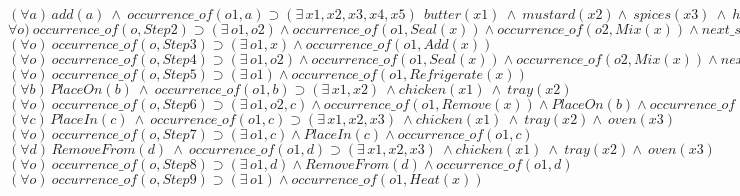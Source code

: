 \documentclass[10pt,a4paper]{article}
\begin{document}
	$(\forall a)\,add(a) \  \wedge \  occurrence\_of(o1,a) \supset (\exists\,x1,x2,x3,x4,x5)\  \ butter(x1) \ \wedge \  mustard(x2) \wedge \ spices(x3) \   \wedge \ hotsauce(x4)  \  \wedge \  thyme(x5)$\\
	
	$\forall o) \ occurrence\_of(o,Step2) \supset (\exists\, o1,o2) \wedge occurrence\_of(o1, Seal(x)) \wedge occurrence\_of(o2, Mix(x)) \wedge  next\_subacc(o1,o2)$\\
	
	$(\forall o) \ occurrence\_of(o,Step3) \supset (\exists\, o1,x) \wedge occurrence\_of(o1, Add(x))$\\
	
	$(\forall o) \ occurrence\_of(o,Step4) \supset (\exists\, o1,o2) \wedge occurrence\_of(o1, Seal(x)) \wedge occurrence\_of(o2, Mix(x)) \wedge  next\_subacc(o1,o2)$\\
	
	$(\forall o) \ occurrence\_of(o,Step5) \supset (\exists\, o1) \wedge occurrence\_of(o1, Refrigerate(x))$\\
	
	$(\forall b)\,PlaceOn(b) \  \wedge \  occurrence\_of(o1,b) \supset (\exists\,x1,x2)\  \wedge chicken(x1) \ \wedge \  tray(x2)$\\
	
	$(\forall o) \ occurrence\_of(o,Step6) \supset (\exists\, o1,o2,c) \wedge occurrence\_of(o1, Remove(x)) \wedge PlaceOn(b) \wedge occurrence\_of(o2, b) \wedge  next\_subacc(o1,o2)$\\
	
$	(\forall c)\,PlaceIn(c) \  \wedge \  occurrence\_of(o1,c) \supset (\exists\,x1,x2,x3)\  \wedge chicken(x1) \ \wedge \  tray(x2) \wedge \ oven(x3)$\\
	
	$(\forall o) \ occurrence\_of(o,Step7) \supset (\exists\, o1,c)  \wedge PlaceIn(c) \wedge occurrence\_of(o1, c)$\\
	
	$(\forall d)\,RemoveFrom(d) \  \wedge \  occurrence\_of(o1,d) \supset (\exists\,x1,x2,x3)\  \wedge chicken(x1) \ \wedge \  tray(x2) \wedge \ oven(x3)$\\
	
$	(\forall o) \ occurrence\_of(o,Step8) \supset (\exists\, o1,d)  \wedge RemoveFrom(d) \wedge occurrence\_of(o1, d)$\\
	
	$(\forall o) \ occurrence\_of(o,Step9) \supset (\exists\, o1) \wedge occurrence\_of(o1, Heat(x))$\\
	
\end{document}
